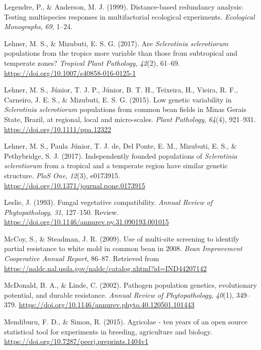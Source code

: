 \documentclass[fleqn,10pt,lineno]{wlpeerj} %
\theoremstyle{definition}
\theoremstyle{definition}
\theoremstyle{definition}
\theoremstyle{remark}
\begin{document}
\hypertarget{ref-legendre1999distance}{}
Legendre, P., \& Anderson, M. J. (1999). Distance-based redundancy
analysis: Testing multispecies responses in multifactorial ecological
experiments. \emph{Ecological Monographs}, \emph{69}, 1--24.

\hypertarget{ref-lehner2017sclerotinia}{}
Lehner, M. S., \& Mizubuti, E. S. G. (2017). Are \emph{Sclerotinia
sclerotiorum} populations from the tropics more variable than those from
subtropical and temperate zones? \emph{Tropical Plant Pathology},
\emph{42}(2), 61--69. \url{https://doi.org/10.1007/s40858-016-0125-1}

\hypertarget{ref-lehner2015genetic}{}
Lehner, M. S., Júnior, T. J. P., Júnior, B. T. H., Teixeira, H., Vieira,
R. F., Carneiro, J. E. S., \& Mizubuti, E. S. G. (2015). Low genetic
variability in \emph{Sclerotinia sclerotiorum} populations from common
bean fields in Minas Gerais State, Brazil, at regional, local and
micro-scales. \emph{Plant Pathology}, \emph{64}(4), 921--931.
\url{https://doi.org/10.1111/ppa.12322}

\hypertarget{ref-lehner2017independently}{}
Lehner, M. S., Paula Júnior, T. J. de, Del Ponte, E. M., Mizubuti, E.
S., \& Pethybridge, S. J. (2017). Independently founded populations of
\emph{Sclerotinia sclerotiorum} from a tropical and a temperate region
have similar genetic structure. \emph{PloS One}, \emph{12}(3), e0173915.
\url{https://doi.org/10.1371/journal.pone.0173915}

\hypertarget{ref-leslie1993fungal}{}
Leslie, J. (1993). Fungal vegetative compatibility. \emph{Annual Review
of Phytopathology}, \emph{31}, 127--150. Review.
\url{https://doi.org/10.1146/annurev.py.31.090193.001015}

\hypertarget{ref-mccoy2009use}{}
McCoy, S., \& Steadman, J. R. (2009). Use of multi-site screening to
identify partial resistance to white mold in common bean in 2008.
\emph{Bean Improvement Cooperative Annual Report}, 86--87. Retrieved
from \url{https://naldc.nal.usda.gov/naldc/catalog.xhtml?id=IND44207142}

\hypertarget{ref-mcdonald2002pathogen}{}
McDonald, B. A., \& Linde, C. (2002). Pathogen population genetics,
evolutionary potential, and durable resistance. \emph{Annual Review of
Phytopathology}, \emph{40}(1), 349--379.
\url{https://doi.org/10.1146/annurev.phyto.40.120501.101443}

\hypertarget{ref-mendiburu2015agricolae}{}
Mendiburu, F. D., \& Simon, R. (2015). Agricolae - ten years of an open
source statistical tool for experiments in breeding, agriculture and
biology. \url{https://doi.org/10.7287/peerj.preprints.1404v1}
\end{document}
